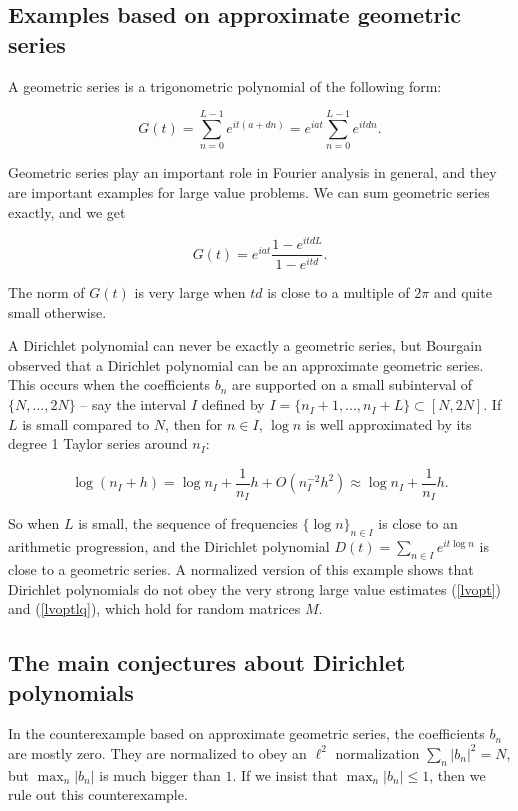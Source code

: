 \documentclass{amsart}
\begin{document}
\subsection{Examples based on approximate geometric series} \label{subsecappgeo}

A geometric series is a trigonometric polynomial of the following form:

$$G(t) =  \sum_{n = 0}^{L-1} e^{ i t (a + d n)} = e^{i a t} \sum_{n = 0}^{L-1} e^{i t d n}. $$

Geometric series play an important role in Fourier analysis in general, and they are important examples for large value problems.  We can sum geometric series exactly, and we get

$$G(t) = e^{i a t} \frac{1 - e^{i t d L}}{1 - e^{i t d}}. $$

\noindent The norm of $G(t)$ is very large when $td$ is close to a multiple of $2 \pi$ and quite small otherwise.   %


A Dirichlet polynomial can never be exactly a geometric series, but Bourgain observed that a Dirichlet polynomial can be an approximate geometric series.  This occurs when the coefficients $b_n$ are supported on a small subinterval of $\{ N, ..., 2N \}$ -- say the interval $I$ defined by $I = \{n_I + 1, ..., n_I + L \} \subset [N, 2N]$.  If $L$ is small compared to $N$, then for $n \in I$, $\log n$ is well approximated by its degree 1 Taylor series around $n_I$:

$$ \log (n_I + h) = \log n_I + \frac{1}{n_I} h + O(n_I^{-2} h^2) \approx \log n_I + \frac{1}{n_I} h .$$

\noindent So when $L$ is small, the sequence of frequencies $\{ \log n \}_{n \in I}$ is close to an arithmetic progression, and the Dirichlet polynomial $D(t) = \sum_{n \in I} e^{i t \log n}$ is close to a geometric series.
A normalized version of this example shows that Dirichlet polynomials do not obey the very strong large value estimates (\ref{lvopt}) and (\ref{lvoptlq}),  which hold for random matrices $M$.

\subsection{The main conjectures about Dirichlet polynomials}

In the counterexample based on approximate geometric series, the coefficients $b_n$ are mostly zero.  They are normalized to obey an $\ell^2$ normalization $\sum_n |b_n|^2 = N$, but $\max_n |b_n|$ is much bigger than $1$.   If we insist that $\max_n |b_n| \le 1$,  then we rule out this counterexample. 
\end{document}
